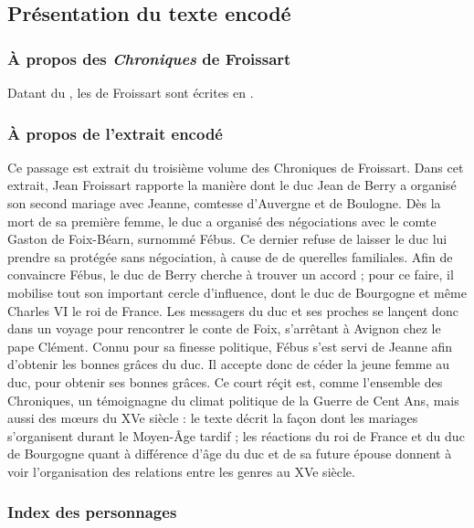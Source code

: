 \documentclass[12pt, a4paper]{article}
\begin{document}
                \subsection{Présentation du texte encodé}
                
        
        \subsubsection{À propos des \textit{Chroniques} de Froissart}
        Datant du , les \textit{} de Froissart sont écrites en . \\ \indent 
        
        \subsubsection{À propos de l'extrait encodé}
        Ce passage est extrait du troisième volume des Chroniques de Froissart. Dans cet extrait, Jean Froissart rapporte la manière
                     dont le duc Jean de Berry a organisé son second mariage avec Jeanne, comtesse d’Auvergne et de Boulogne.
                     Dès la mort de sa première femme, le duc a organisé des négociations avec le comte Gaston de Foix-Béarn, surnommé Fébus. Ce dernier refuse de laisser
                     le duc lui prendre sa protégée sans négociation, à cause de de querelles familiales. Afin de convaincre Fébus, le duc de Berry cherche à trouver
                     un accord ; pour ce faire, il mobilise tout son important cercle d'influence, dont le duc de Bourgogne et même Charles VI le roi de France. Les messagers du duc et ses proches se lançent donc dans un voyage pour rencontrer le conte de Foix, s'arrêtant à Avignon chez le pape Clément. Connu pour
                     sa finesse politique, Fébus s'est servi de Jeanne
                     afin d'obtenir les bonnes grâces du duc. Il accepte donc de céder la jeune femme au duc, pour obtenir ses bonnes grâces. Ce court réçit est, comme l'ensemble des Chroniques, un témoignagne du climat politique de la Guerre de Cent Ans, mais aussi des mœurs du XVe siècle : le texte décrit 
                     la façon dont les mariages s'organisent durant le Moyen-Âge tardif ; les réactions du roi de France et du duc de Bourgogne quant à différence d'âge du duc et de sa future
                     épouse donnent à voir l'organisation des relations entre les genres au XVe siècle.
        
        \subsubsection{Index des personnages}
        \begin{itemize}\end{itemize}
        
\end{document}
